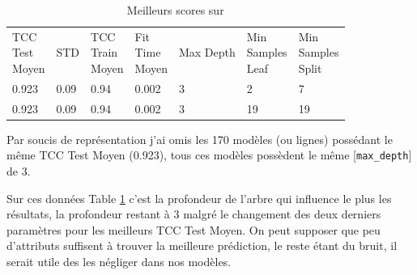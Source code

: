 \documentclass[10pt,letterpaper]{article}
\newlength\savedwidth
\newcommand\thickhline{\noalign{\global\savedwidth\arrayrulewidth\global\arrayrulewidth 2pt}%
\hline
\noalign{\global\arrayrulewidth\savedwidth}}
\begin{document}
\begin{table}[h]
  {\centering
  \caption{Meilleurs scores sur \protect{}}
  \label{table:scores_dj}
  \begin{adjustbox}{width=\textwidth}
\begin{tabular}{lllllll}
\hline
\thead{TCC \\Test\\ Moyen} & STD & \thead{TCC\\ Train \\Moyen} & \thead{Fit \\Time\\ Moyen} & Max Depth & \thead{Min \\Samples \\Leaf} & \thead{Min \\Samples \\Split}
\\ \thickhline
0.923 & 0.09 & \hspace{5mm}0.94 & \hspace{5mm}0.002 & \hspace{5mm}3 & \hspace{5mm}2 &\hspace{5mm}7 \\ \hline
0.923 & 0.09 & \hspace{5mm}0.94 & \hspace{5mm}0.002 & \hspace{5mm}3 & \hspace{5mm}19 &\hspace{5mm}19 \\ \hline
\end{tabular}
\end{adjustbox}}
\footnotesize{Par soucis de représentation j’ai omis les 170 modèles (ou lignes) possédant le même TCC Test Moyen (0.923), tous ces modèles possèdent le même [\verb!max_depth!] de 3.}
\end{table}

Sur ces données Table \ref{table:scores_dj} c’est la profondeur de l’arbre qui influence le plus les résultats, la profondeur restant à 3 malgré le changement des deux derniers paramètres pour les meilleurs TCC Test Moyen. On peut supposer que peu d’attributs suffisent à trouver la meilleure prédiction, le reste étant du bruit, il serait utile des les négliger dans nos modèles.

\newpage
\end{document}
